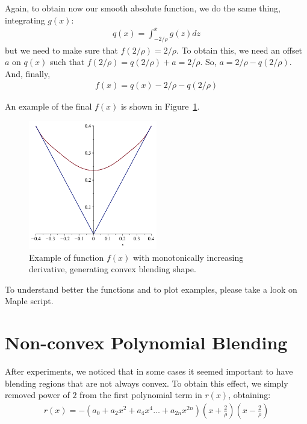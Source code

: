 \documentclass[11pt]{article}
\begin{document}
Again, to obtain now our smooth absolute function, we do the same thing, integrating $g(x)$:
\begin{align*}
  q(x) = \int_{-2/\rho}^{x} g(z) dz
\end{align*}
but we need to make sure that $f(2/\rho) = 2/\rho$. To obtain this, we need an offset $a$ on $q(x)$ such that $f(2/\rho) = q(2/\rho) + a = 2/\rho$. So, $a = 2/\rho - q(2/\rho)$. And, finally,
\begin{align*}
  f(x) = q(x) - 2/\rho - q(2/\rho)
\end{align*}

An example of the final $f(x)$ is shown in Figure~\ref{fig:example_f1}.
  \begin{figure}[!hbt]
    \begin{center}
      \includegraphics[width=0.5\textwidth]{example_f1}
    \end{center}
    \caption{Example of function $f(x)$ with monotonically increasing derivative, generating convex blending shape.}
    \label{fig:example_f1}
  \end{figure}


To understand better the functions and to plot examples, please take a look on Maple script\linebreak {}.

\section{Non-convex Polynomial Blending}
After experiments, we noticed that in some cases it seemed important to have blending regions that are not always convex. To obtain this effect, we simply removed power of $2$ from the first polynomial term in $r(x)$, obtaining:
 \begin{align}
  r(x) = -\left(a_0 + a_2 x^2 + a_4 x^4 \dots + a_{2n} x^{2n}  \right) \left(x + \frac2\rho\right) \left(x - \frac2\rho\right)
\end{align}
\end{document}
